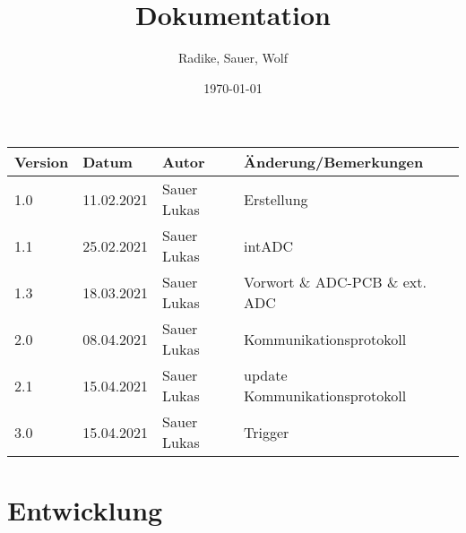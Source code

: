 \documentclass[a4paper,12pt]{article}
\begin{document}
\title{Dokumentation}
\author{Radike, Sauer, Wolf}
\date{\today}
\maketitle

\begin{tabular}[h]{l|l|l|l} %
	Version & Datum & Autor & Änderung/Bemerkungen\\
	\hline\hline
	1.0 & 11.02.2021 & Sauer Lukas & Erstellung\\
	\hline
	1.1 & 25.02.2021 & Sauer Lukas & intADC\\
	\hline
	1.3 & 18.03.2021 & Sauer Lukas &  Vorwort \& ADC-PCB \& ext. ADC\\
	\hline
	2.0 & 08.04.2021 & Sauer Lukas &  Kommunikationsprotokoll\\
	\hline
	2.1 & 15.04.2021 & Sauer Lukas &  update Kommunikationsprotokoll\\
	\hline
	3.0 & 15.04.2021 & Sauer Lukas &  Trigger\\
\end{tabular}
\newpage
\tableofcontents
\newpage


\section{Entwicklung}



\end{document}
